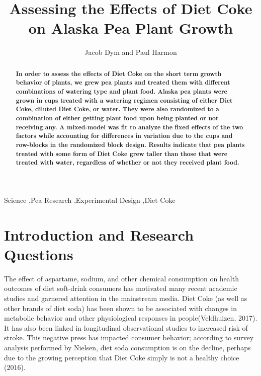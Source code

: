 \documentclass[1p,12pt]{elsarticle}\usepackage[]{graphicx}\usepackage[]{color}
\begin{document}
\begin{frontmatter}


\title{Assessing the Effects of Diet Coke on Alaska Pea Plant Growth}

\author{Jacob Dym and Paul Harmon}

\address{Montana State University}

\begin{abstract}
\textbf{
In order to assess the effects of Diet Coke on the short term growth behavior of plants, we grew pea plants and treated them with different combinations of watering type and plant food. Alaska pea plants were grown in cups treated with a watering regimen consisting of either Diet Coke, diluted Diet Coke, or water. They were also randomized to a combination of either getting plant food upon being planted or not receiving any. A mixed-model was fit to analyze the fixed effects of the two factors while accounting for differences in variation due to the cups and row-blocks in the randomized block design. Results indicate that pea plants treated with some form of Diet Coke grew taller than those that were treated with water, regardless of whether or not they received plant food.
}
\end{abstract}
\begin{keyword}
Science \sep Pea Research \sep Experimental Design \sep Diet Coke
\end{keyword}


\end{frontmatter}



\section{Introduction and Research Questions}

The effect of aspartame, sodium, and other chemical consumption on health outcomes of diet soft-drink consumers has motivated many recent academic studies and garnered attention in the mainstream media. Diet Coke (as well as other brands of diet soda) has been shown to be associated with changes in metabolic behavior and other physiological responses  in people(Veldhuizen, 2017). It has also been linked in longitudinal observational studies to increased risk of stroke. This negative press has impacted consumer behavior; according to survey analysis performed by Nielsen, diet soda consumption is on the decline, perhaps due to the growing perception that Diet Coke simply is not a healthy choice (2016).
\end{document}
